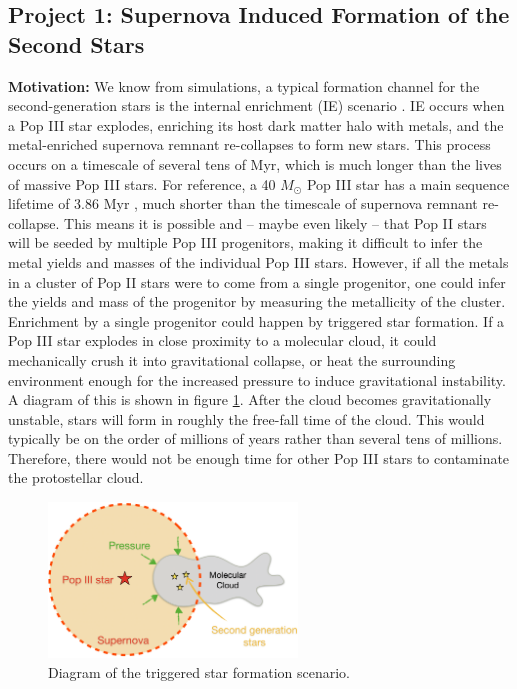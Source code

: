 \documentclass[letterpaper, 12pt]{article}
\begin{document}
\subsection*{Project 1: Supernova Induced Formation of the Second Stars}
\label{sec:tsf}

\textbf{Motivation:} We know from simulations, a typical formation channel for the second-generation stars is the internal enrichment (IE) scenario \citep{Chiaki2019}. IE occurs when a Pop III star explodes, enriching its host dark matter halo with metals, and the metal-enriched supernova remnant re-collapses to form new stars. This process occurs on a timescale of several tens of Myr, which is much longer than the lives of massive Pop III stars. For reference, a 40 $M_\odot$ Pop III star has a main sequence lifetime of 3.86 Myr \citep{Schaerer2002}, much shorter than the timescale of supernova remnant re-collapse. This means it is possible and -- maybe even likely -- that Pop II stars will be seeded by multiple Pop III progenitors, making it difficult to infer the metal yields and masses of the individual Pop III stars. However, if all the metals in a cluster of Pop II stars were to come from a single progenitor, one could infer the yields and mass of the progenitor by measuring the metallicity of the cluster. Enrichment by a single progenitor could happen by triggered star formation. If a Pop III star explodes in close proximity to a molecular cloud, it could mechanically crush it into gravitational collapse, or heat the surrounding environment enough for the increased pressure to induce gravitational instability. A diagram of this is shown in figure \ref{fig:tsf}. After the cloud becomes gravitationally unstable, stars will form in roughly the free-fall time of the cloud. This would typically be on the order of millions of years rather than several tens of millions. Therefore, there would not be enough time for other Pop III stars to contaminate the protostellar cloud.

\begin{figure}
  \includegraphics[width=0.59\textwidth]{figures/tsf2}
  \caption{Diagram of the triggered star formation scenario.}
  \label{fig:tsf}
\end{figure}
\end{document}
